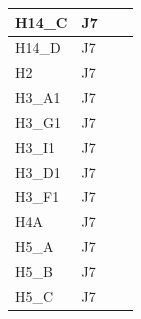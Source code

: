 \begin{longtable}{|l|l|l|l|}
H14\_C                           & J7                                                &                                                  &                                                  \\ \hline
H14\_D                           & J7                                                &                                                  &                                                  \\ \hline
H2                           & J7                                                &                                                  &                                                  \\ \hline
H3\_A1                           & J7                                                &                                                  &                                                  \\ \hline
H3\_G1                           & J7                                                &                                                  &                                                  \\ \hline
H3\_I1                           & J7                                                &                                                  &                                                  \\ \hline
H3\_D1                           & J7                                                &                                                  &                                                  \\ \hline
H3\_F1                           & J7                                                &                                                  &                                                  \\ \hline
H4A                           & J7                                                &                                                  &                                                  \\ \hline
H5\_A                           & J7                                                &                                                  &                                                  \\ \hline
H5\_B                           & J7                                                &                                                  &                                                  \\ \hline
H5\_C                           & J7                                                &                                                  &                                                  \\ \hline

\end{longtable}
